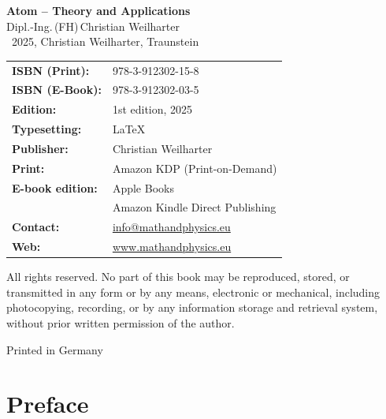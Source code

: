 \cleardoublepage
\thispagestyle{empty}
\begin{center}
	
	{\Large\textbf{Atom – Theory and Applications}}\\[1.2em]
	{\large Dipl.-Ing.\,(FH)\,Christian Weilharter}\\[1.2em]
	\textcopyright~2025, Christian Weilharter, Traunstein\\[2em]
\end{center}

\begin{flushleft}
	\begin{tabular}{@{}l l}
		\textbf{ISBN (Print):} & 978-3-912302-15-8 \\[0.5em]
		\textbf{ISBN (E-Book):} & 978-3-912302-03-5 \\[0.5em]
		\textbf{Edition:} & 1st edition, 2025 \\[0.5em]
		\textbf{Typesetting:} & \LaTeX \\[0.5em]
		\textbf{Publisher:} & Christian Weilharter \\[0.5em]

		\textbf{Print:} & Amazon KDP (Print-on-Demand) \\[0.5em]
		\textbf{E-book edition:} & Apple Books \\[0.5em]
		& Amazon Kindle Direct Publishing \\[0.5em]
		\textbf{Contact:} & \href{mailto:info@mathandphysics.de}{info@mathandphysics.eu} \\[0.5em]
		\textbf{Web:} & \href{https://www.mathandphysics.de}{www.mathandphysics.eu} \\

	\end{tabular}
\end{flushleft}

\vspace{2em}
\noindent
All rights reserved. No part of this book may be reproduced, stored, or transmitted
in any form or by any means, electronic or mechanical, including photocopying,
recording, or by any information storage and retrieval system, without prior written
permission of the author.

\begin{center}\small Printed in Germany\end{center}

\cleardoublepage


\chapter*{Preface}



